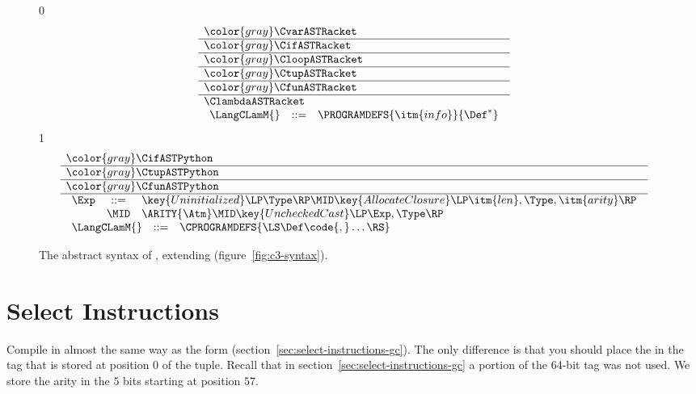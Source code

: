 \documentclass[7x10]{TimesAPriori_MIT}%
\newcommand{\gray}[1]{{\color{gray} #1}}
\def\racketEd{0}
\def\pythonEd{1}
\def\edition{1}
\newcommand{\pythonColor}[0]{}
\numberwithin{theorem}{chapter}
\numberwithin{definition}{chapter}
\numberwithin{equation}{chapter}
\begin{document}
\newcommand{\ClambdaASTPython}{
\begin{array}{lcl}
\Exp &::=& \key{Uninitialized}\LP \Type \RP
      \MID \key{AllocateClosure}\LP\itm{len},\Type, \itm{arity}\RP \\
      &\MID& \ARITY{\Atm}
      \MID \key{UncheckedCast}\LP\Exp,\Type\RP
\end{array}
}

\begin{figure}[tp]
  \begin{tcolorbox}[colback=white]
\small
{\if\edition\racketEd
\[
\begin{array}{l}
  \gray{\CvarASTRacket} \\ \hline
  \gray{\CifASTRacket} \\ \hline
  \gray{\CloopASTRacket} \\ \hline
  \gray{\CtupASTRacket} \\ \hline
  \gray{\CfunASTRacket} \\ \hline
  \ClambdaASTRacket \\
\begin{array}{lcl}
\LangCLamM{} & ::= & \PROGRAMDEFS{\itm{info}}{\Def^{*}}
\end{array}
\end{array}
\]
\fi}
{\if\edition\pythonEd\pythonColor
\[
  \begin{array}{l}
  \gray{\CifASTPython} \\ \hline
  \gray{\CtupASTPython} \\ \hline
  \gray{\CfunASTPython} \\ \hline
  \ClambdaASTPython \\
  \begin{array}{lcl}
    \LangCLamM{} & ::= & \CPROGRAMDEFS{\LS\Def\code{,}\ldots\RS} 
  \end{array}
  \end{array}
\]
\fi}
  \end{tcolorbox}

\caption{The abstract syntax of \LangCLam{}, extending \LangCFun{} (figure~\ref{fig:c3-syntax}).}
\label{fig:Clam-syntax}
\end{figure}


\section{Select Instructions}
\label{sec:select-instructions-Llambda}

Compile  in almost the
same way as the  form
(section~\ref{sec:select-instructions-gc}). The only difference is
that you should place the  in the tag that is stored at
position $0$ of the tuple. Recall that in
section~\ref{sec:select-instructions-gc} a portion of the 64-bit tag
was not used. We store the arity in the $5$ bits starting at position
$57$.
\end{document}
